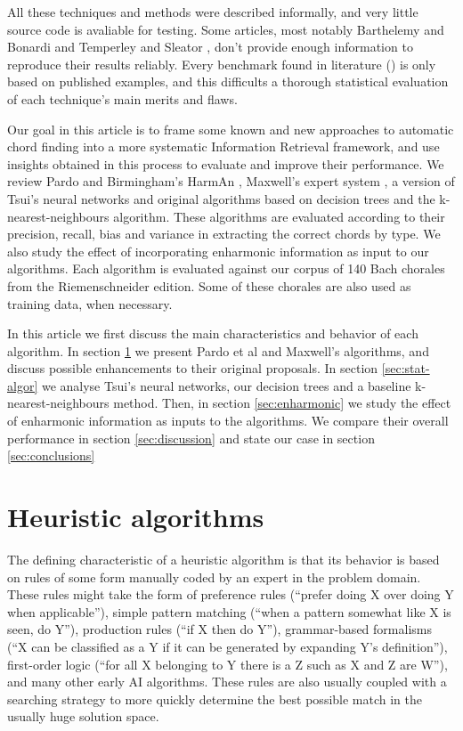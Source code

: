 \documentclass{article}
\begin{document}
All these techniques and methods were described informally, and very
little source code is avaliable for testing.  Some articles, most
notably Barthelemy and Bonardi \cite{barthelemy.ea:figured} and
Temperley and Sleator \cite{temperley.ea:modeling}, don't provide
enough information to reproduce their results reliably.  Every
benchmark found in literature (\cite{pardo.ea:automated,
  barthelemy.ea:figured, tsui:harmonic, taube:automatic,
  illescas.ea:harmonic}) is only based on published examples, and this
difficults a thorough statistical evaluation of each technique's main
merits and flaws.

Our goal in this article is to frame some known and new approaches to
automatic chord finding into a more systematic Information
Retrieval framework, and use insights obtained in this process to
evaluate and improve their performance.  We review Pardo and
Birmingham's HarmAn \cite{pardo.ea:automated}, Maxwell's expert system
\cite{maxwell:expert}, a version of Tsui's neural networks
\cite{tsui:harmonic} and original algorithms based on decision trees
and the k-nearest-neighbours algorithm.  These algorithms are
evaluated according to their precision, recall, bias and variance in
extracting the correct chords by type.  We also study the effect of
incorporating enharmonic information as input to our algorithms. Each
algorithm is evaluated against our corpus of 140 Bach chorales from
the Riemenschneider \cite{bach:371} edition.  Some of these chorales
are also used as training data, when necessary.

In this article we first discuss the main characteristics and behavior
of each algorithm.  In section \ref{sec:heuristic-algorithms} we
present Pardo et al and Maxwell's algorithms, and discuss possible
enhancements to their original proposals.  In section
\ref{sec:stat-algor} we analyse Tsui's neural networks, our decision
trees and a baseline k-nearest-neighbours method. Then, in section
\ref{sec:enharmonic} we study the effect of enharmonic information as
inputs to the algorithms.  We compare their overall performance in
section \ref{sec:discussion} and state our case in section
\ref{sec:conclusions}


\section{Heuristic algorithms}
\label{sec:heuristic-algorithms}

The defining characteristic of a heuristic algorithm is that its
behavior is based on rules of some form manually coded by an expert in
the problem domain.  These rules might take the form of preference
rules (``prefer doing X over doing Y when applicable''), simple
pattern matching (``when a pattern somewhat like X is seen, do Y''),
production rules (``if X then do Y''), grammar-based formalisms (``X
can be classified as a Y if it can be generated by expanding Y's
definition''), first-order logic (``for all X belonging to Y there is
a Z such as X and Z are W''), and many other early
AI algorithms.  These rules are also usually coupled with a searching
strategy to more quickly determine the best possible match in the
usually huge solution space.
\end{document}
